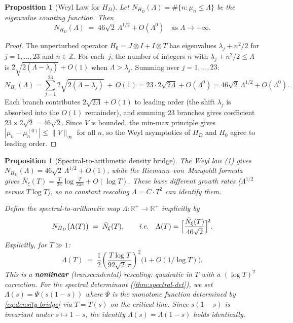 \documentclass[11pt,a4paper]{article}
\theoremstyle{plain}
\newtheorem{proposition}[theorem]{Proposition}
\theoremstyle{remark}
\newcommand{\Z}{\mathbb{Z}}
\newcommand{\R}{\mathbb{R}}
\newcommand{\norm}[1]{\lVert #1 \rVert}
\begin{document}
\begin{proposition}[Weyl Law for $H_D$]\label{prop:weyl}
Let $N_{H_D}(\Lambda)=\#\{n:\mu_n\leq\Lambda\}$ be the eigenvalue
counting function.  Then
\begin{equation}\label{eq:weyl}
  N_{H_D}(\Lambda) \;=\; 46\sqrt{2}\,\Lambda^{1/2}
  + O(\Lambda^0)
  \quad\text{as }\Lambda\to+\infty.
\end{equation}
\end{proposition}

\begin{proof}
The unperturbed operator $H_0=J\otimes I+I\otimes T$ has eigenvalues
$\lambda_j+n^2/2$ for $j=1,\ldots,23$ and $n\in\Z$.
For each~$j$, the number of integers $n$ with $\lambda_j+n^2/2\leq\Lambda$
is $2\sqrt{2(\Lambda-\lambda_j)}+O(1)$ when $\Lambda>\lambda_j$.
Summing over $j=1,\ldots,23$:
\[
  N_{H_0}(\Lambda) = \sum_{j=1}^{23}
  2\sqrt{2(\Lambda-\lambda_j)}\,+\,O(1)
  = 23\cdot 2\sqrt{2\Lambda}+O(\Lambda^0)
  = 46\sqrt{2}\,\Lambda^{1/2}+O(\Lambda^0).
\]
Each branch contributes $2\sqrt{2\Lambda}+O(1)$ to leading order
(the shift $\lambda_j$ is absorbed into the $O(1)$ remainder),
and summing $23$ branches gives coefficient $23\times 2\sqrt{2}=46\sqrt{2}$.
Since $V$ is bounded, the min-max principle gives
$|\mu_n-\mu_n^{(0)}|\leq\norm{V}_\infty$ for all $n$, so the Weyl
asymptotics of $H_D$ and $H_0$ agree to leading order.
\end{proof}

\begin{proposition}[Spectral-to-arithmetic density bridge]
\label{prop:density-bridge}
The Weyl law (\cref{prop:weyl}) gives
$N_{H_D}(\Lambda) = 46\sqrt{2}\,\Lambda^{1/2} + O(1)$, while
the Riemann--von~Mangoldt formula gives
$\bar N_\xi(T) = \tfrac{T}{2\pi}\log\tfrac{T}{2\pi e} + O(\log T)$.
These have different growth rates ($\Lambda^{1/2}$ versus $T\log T$),
so no constant rescaling $\Lambda = C\cdot T^2$ can identify them.

Define the spectral-to-arithmetic map
$\Lambda\colon\R^+\to\R^+$ implicitly by
\begin{equation}\label{eq:density-bridge}
  N_{H_D}\bigl(\Lambda(T)\bigr) \;=\; \bar N_\xi(T),
  \qquad\textit{i.e.}\quad
  \Lambda(T) = \Bigl[\frac{\bar N_\xi(T)}{46\sqrt{2}}\Bigr]^{\!2}.
\end{equation}
Explicitly, for $T\gg 1$:
\[
  \Lambda(T) \;=\; \frac{1}{2}\!
  \left(\frac{T\log T}{92\sqrt{2}\,\pi}\right)^{\!2}
  \bigl(1 + O(1/\log T)\bigr).
\]
This is a \textbf{nonlinear} (transcendental) rescaling: quadratic
in $T$ with a $(\log T)^2$ correction.  For the spectral determinant
(\cref{thm:spectral-det}), we set $\Lambda(s) = \Psi(s(1{-}s))$
where $\Psi$ is the monotone function determined by
\cref{eq:density-bridge} via $T = T(s)$ on the critical line.
Since $s(1{-}s)$ is invariant under $s\mapsto 1{-}s$,
the identity $\Lambda(s) = \Lambda(1{-}s)$ holds identically.
\end{proposition}
\end{document}
